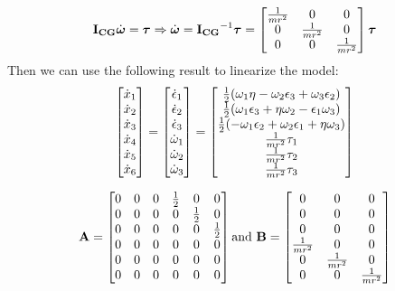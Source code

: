 \begin{equation*}
    \mathbf{I_{CG}} \dot{\boldsymbol{\omega}} = \boldsymbol{\tau}\\
    \Rightarrow \dot{\boldsymbol{\omega}} = \mathbf{I_{CG}}^{-1}\boldsymbol{\tau} = \begin{bmatrix}\frac{1}{mr^2} & 0 & 0 \\ 0 & \frac{1}{mr^2} & 0 \\ 0 & 0 & \frac{1}{mr^2}\end{bmatrix} \boldsymbol{\tau}
\end{equation*}
Then we can use the following result  to linearize the model:
\begin{equation*}
\begin{bmatrix}\dot x_1 \\ \dot x_2 \\ \dot x_3 \\ \dot x_4 \\ \dot x_5 \\ \dot x_6 \end{bmatrix} 
=\begin{bmatrix}\dot \epsilon_1 \\ \dot \epsilon_2 \\ \dot \epsilon_3 \\ \dot \omega_1 \\ \dot \omega_2 \\ \dot \omega_3\end{bmatrix} 
= \begin{bmatrix}\frac{1}{2}(\omega_1 \eta - \omega_2 \epsilon_3 + \omega_3 \epsilon_2) \\ \frac{1}{2} (\omega_1 \epsilon_3 + \eta \omega_2 - \epsilon_1 \omega_3) \\ \frac{1}{2}(-\omega_1 \epsilon_2 + \omega_2 \epsilon_1 + \eta \omega_3) \\ \frac{1}{mr^2}\tau_1 \\ \frac{1}{mr^2}\tau_2 \\ \frac{1}{mr^2}\tau_3\end{bmatrix}
\end{equation*}


\begin{equation*}
    \mathbf{A} =  \begin{bmatrix}
        0   &   0   &   0   &   \frac{1}{2} &   0           &   0\\
        0   &   0   &   0   &   0           &   \frac{1}{2} &   0\\
        0   &   0   &   0   &   0           &   0           &   \frac{1}{2}\\
        0   &   0   &   0   &   0           &   0           &   0\\
        0   &   0   &   0   &   0           &   0           &   0\\
        0   &   0   &   0   &   0           &   0           &   0\\\end{bmatrix}
    \text{and  }
    \mathbf{B} = \begin{bmatrix}
        0       &   0       &   0       \\
        0       &   0       &   0       \\
        0       &   0       &   0       \\
        \frac{1}{mr^2}  &   0       &   0       \\
        0       &   \frac{1}{mr^2}  &   0       \\
        0       &   0       &   \frac{1}{mr^2}  \\\end{bmatrix}
\end{equation*}
